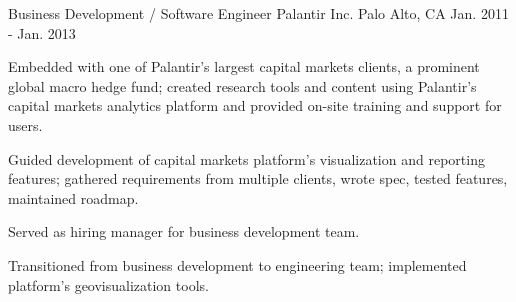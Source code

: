 \begin{cventries}
  \cventry
    {Business Development / Software Engineer} %
    {Palantir Inc.} %
    {Palo Alto, CA} %
    {Jan. 2011 - Jan. 2013} %
    {
      \begin{cvitems} %
        \item {Embedded with one of Palantir's largest capital markets clients, a prominent global macro hedge fund; created research tools and content using Palantir's capital markets analytics platform and provided on-site training and support for users.}
        \item {Guided development of capital markets platform's visualization and reporting features; gathered requirements from multiple clients, wrote spec, tested features, maintained roadmap.}
        \item {Served as hiring manager for business development team.}
        \item {Transitioned from business development to engineering team; implemented platform's geovisualization tools.}
      \end{cvitems}
    }

\end{cventries}
